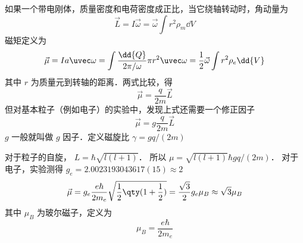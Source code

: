
如果一个带电刚体，质量密度和电荷密度成正比，当它绕轴转动时，角动量为
\begin{equation}
\vec L = I\vec \omega  = \vec \omega \int r^2 \rho_m \dd{V}
\end{equation}
磁矩定义为
\begin{equation}
\vec \mu  = Ia \uvec\omega = \int \frac{\dd{Q}}{2\pi/\omega}  \pi r^2 \uvec \omega
= \frac12 \vec \omega \int r^2\rho_e \dd{V} 
\end{equation}
其中 $r$ 为质量元到转轴的距离．两式比较，得
\begin{equation}
\vec \mu  = \frac{q}{2m} \vec L
\end{equation}
但对基本粒子（例如电子）的实验中，发现上式还需要一个修正因子
\begin{equation}
\vec \mu  = g\frac{q}{2m}\vec L
\end{equation}
$g$ 一般就叫做 $g$ 因子．定义磁旋比 $\gamma  = gq/(2m)$

对于粒子的自旋， $L = \hbar \sqrt{l(l + 1)} $． 所以 $\mu = \sqrt{l (l + 1)} \hbar gq/(2m)$． 
对于电子，实验测得 $g_e = 2.0023193043617(15) \approx 2$ 
\begin{equation}
\vec \mu  = g_e \frac{e\hbar}{2 m_e} \sqrt{\frac12 \qty(1 + \frac12)}  = \frac{\sqrt 3}{2} g_e \mu_B \approx \sqrt 3 \mu_B
\end{equation}
其中 $\mu_B$ 为玻尔磁子，定义为
\begin{equation}
\mu_B = \frac{e\hbar}{2 m_e}
\end{equation}

